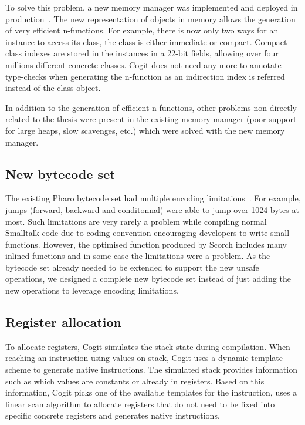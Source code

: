 \documentclass[a4paper,12pt,twoside]{../includes/ThesisStyle}
\begin{document}
To solve this problem, a new memory manager was implemented and deployed in production~\cite{Mir15a}. The new representation of objects in memory allows the generation of very efficient n-functions. For example, there is now only two ways for an instance to access its class, the class is either immediate or compact. Compact class indexes are stored in the instances in a 22-bit fields, allowing over four millions different concrete classes. Cogit does not need any more to annotate type-checks when generating the n-function as an indirection index is referred instead of the class object.

In addition to the generation of efficient n-functions, other problems non directly related to the thesis were present in the existing memory manager (poor support for large heaps, slow scavenges, etc.) which were solved with the new memory manager.


\subsection{New bytecode set}

The existing Pharo bytecode set had multiple encoding limitations~\cite{Bera14a}. For example, jumps (forward, backward and conditonnal) were able to jump over 1024 bytes at most. Such limitations are very rarely a problem while compiling normal Smalltalk code due to coding convention encouraging developers to write small functions. However, the optimised function produced by Scorch includes many inlined functions and in some case the limitations were a problem. As the bytecode set already needed to be extended to support the new unsafe operations, we designed a complete new bytecode set instead of just adding the new operations to leverage encoding limitations.

\subsection{Register allocation}

To allocate registers, Cogit simulates the stack state during compilation. When reaching an instruction using values on stack, Cogit uses a dynamic template scheme to generate native instructions. The simulated stack provides information such as which values are constants or already in registers. Based on this information, Cogit picks one of the available templates for the instruction, uses a linear scan algorithm to allocate registers that do not need to be fixed into specific concrete registers and generates native instructions.
\end{document}
